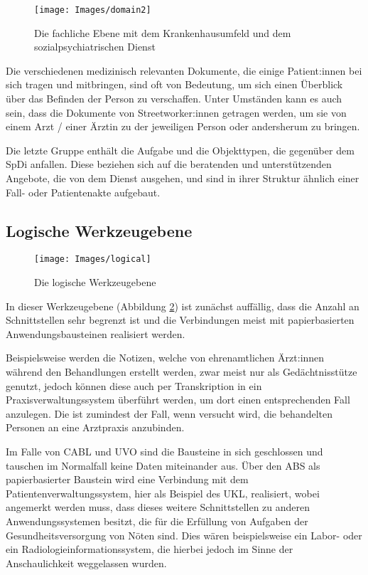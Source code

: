 \begin{figure}[h]
	\centering
	\texttt{[image: Images/domain2]}
	\caption[Fachliche Ebene - Teil 2]{Die fachliche Ebene mit dem Krankenhausumfeld und dem sozialpsychiatrischen Dienst}
	\label{fig:domain2}
\end{figure}

Die verschiedenen medizinisch relevanten Dokumente, die einige Patient:innen bei sich tragen und mitbringen, sind oft von Bedeutung, um sich einen Überblick über das Befinden der Person zu verschaffen. Unter Umständen kann es auch sein, dass die Dokumente von Streetworker:innen getragen werden, um sie von einem Arzt / einer Ärztin zu der jeweiligen Person oder andersherum zu bringen.

Die letzte Gruppe enthält die Aufgabe und die Objekttypen, die gegenüber dem \ac{SpDi} anfallen. Diese beziehen sich auf die beratenden und unterstützenden Angebote, die von dem Dienst ausgehen, und sind in ihrer Struktur ähnlich einer Fall- oder Patientenakte aufgebaut.

\subsection{Logische Werkzeugebene}

\begin{figure}[h]
	\centering
	\texttt{[image: Images/logical]}
	\caption[Logische Werkzeugebene]{Die logische Werkzeugebene}
	\label{fig:logical}
\end{figure}

In dieser Werkzeugebene (Abbildung \ref{fig:logical}) ist zunächst auffällig, dass die Anzahl an Schnittstellen sehr begrenzt ist und die Verbindungen meist mit papierbasierten Anwendungsbausteinen realisiert werden.

Beispielsweise werden die Notizen, welche von ehrenamtlichen Ärzt:innen während den Behandlungen erstellt werden, zwar meist nur als Gedächtnisstütze genutzt, jedoch können diese auch per Transkription in ein Praxisverwaltungssystem überführt werden, um dort einen entsprechenden Fall anzulegen. Die ist zumindest der Fall, wenn versucht wird, die behandelten Personen an eine Arztpraxis anzubinden.

Im Falle von \ac{CABL} und \ac{UVO} sind die Bausteine in sich geschlossen und tauschen im Normalfall keine Daten miteinander aus. Über den \ac{ABS} als papierbasierter Baustein wird eine Verbindung mit dem Patientenverwaltungssystem, hier als Beispiel des \ac{UKL}, realisiert, wobei angemerkt werden muss, dass dieses weitere Schnittstellen zu anderen Anwendungssystemen besitzt, die für die Erfüllung von Aufgaben der Gesundheitsversorgung von Nöten sind. Dies wären beispielsweise ein Labor- oder ein Radiologieinformationssystem, die hierbei jedoch im Sinne der Anschaulichkeit weggelassen wurden.

